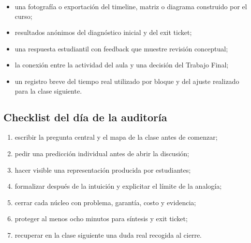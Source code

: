 \documentclass[variant=docente,cover=institutional,mode=screen]{ua-engineering-v6-article}
\begin{document}
\begin{itemize}
\item una fotografía o exportación del timeline, matriz o diagrama construido por el curso;
\item resultados anónimos del diagnóstico inicial y del exit ticket;
\item una respuesta estudiantil con feedback que muestre revisión conceptual;
\item la conexión entre la actividad del aula y una decisión del Trabajo Final;
\item un registro breve del tiempo real utilizado por bloque y del ajuste realizado para la clase siguiente.
\end{itemize}

\subsection{Checklist del día de la auditoría}

\begin{enumerate}
\item escribir la pregunta central y el mapa de la clase antes de comenzar;
\item pedir una predicción individual antes de abrir la discusión;
\item hacer visible una representación producida por estudiantes;
\item formalizar después de la intuición y explicitar el límite de la analogía;
\item cerrar cada núcleo con problema, garantía, costo y evidencia;
\item proteger al menos ocho minutos para síntesis y exit ticket;
\item recuperar en la clase siguiente una duda real recogida al cierre.
\end{enumerate}
\end{document}
